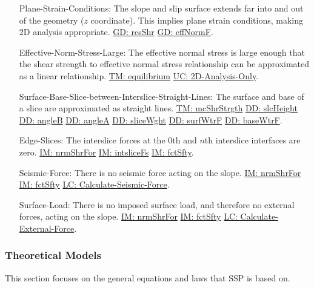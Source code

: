 \documentclass[12pt]{article}
\begin{document}
\begin{itemize}
\item[Plane-Strain-Conditions:\phantomsection\label{assumpPSC}]The slope and slip surface extends far into and out of the geometry ($z$ coordinate). This implies plane strain conditions, making 2D analysis appropriate. \hyperref[GD:resShr]{GD: resShr} \hyperref[GD:effNormF]{GD: effNormF}.
\item[Effective-Norm-Stress-Large:\phantomsection\label{assumpENSL}]The effective normal stress is large enough that the shear strength to effective normal stress relationship can be approximated as a linear relationship. \hyperref[TM:equilibrium]{TM: equilibrium} \hyperref[UC_2donly]{UC: 2D-Analysis-Only}.
\item[Surface-Base-Slice-between-Interslice-Straight-Lines:\phantomsection\label{assumpSBSBISL}]The surface and base of a slice are approximated as straight lines. \hyperref[TM:mcShrStrgth]{TM: mcShrStrgth} \hyperref[DD:slcHeight]{DD: slcHeight} \hyperref[DD:angleB]{DD: angleB} \hyperref[DD:angleA]{DD: angleA} \hyperref[DD:sliceWght]{DD: sliceWght} \hyperref[DD:surfWtrF]{DD: surfWtrF} \hyperref[DD:baseWtrF]{DD: baseWtrF}.
\item[Edge-Slices:\phantomsection\label{assumpES}]The interslice forces at the 0th and $n$th interslice interfaces are zero. \hyperref[IM:nrmShrFor]{IM: nrmShrFor} \hyperref[IM:intsliceFs]{IM: intsliceFs} \hyperref[IM:fctSfty]{IM: fctSfty}.
\item[Seismic-Force:\phantomsection\label{assumpSF}]There is no seismic force acting on the slope. \hyperref[IM:nrmShrFor]{IM: nrmShrFor} \hyperref[IM:fctSfty]{IM: fctSfty} \hyperref[LC_seismic]{LC: Calculate-Seismic-Force}.
\item[Surface-Load:\phantomsection\label{assumpSL}]There is no imposed surface load, and therefore no external forces, acting on the slope. \hyperref[IM:nrmShrFor]{IM: nrmShrFor} \hyperref[IM:fctSfty]{IM: fctSfty} \hyperref[LC_external]{LC: Calculate-External-Force}.
\end{itemize}
\subsubsection{Theoretical Models}
\label{Sec:TMs}
This section focuses on the general equations and laws that SSP is based on.
\par~
\end{document}
